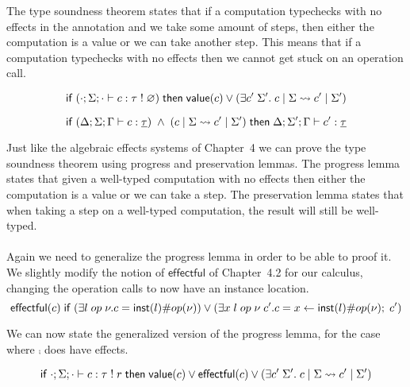 {The type soundness theorem states that if a computation typechecks with no effects in the annotation and we take some amount of steps, then either the computation is a value or we can take another step.
This means that if a computation typechecks with no effects then we cannot get stuck on an operation call.

\begin{lemma}[Progress]
\[
	\mathsf{if}\;
		(\cdot;\Sigma;\cdot \vdash c : \tau \; ! \; \varnothing)
	\;\mathsf{then}\;
		\mathsf{value}(c)
		\lor
		(\exists c' \; \Sigma'.\; c \;|\; \Sigma \rightsquigarrow c' \;|\; \Sigma')
\]
\end{lemma}

\begin{lemma}[Preservation]
\[
	\mathsf{if}\;
		(\Delta;\Sigma;\Gamma \vdash c : \underline{\tau})
		\;\land\;
		(c \;|\; \Sigma \rightsquigarrow c' \;|\; \Sigma')
	\;\mathsf{then}\;
		\Delta;\Sigma';\Gamma \vdash c' : \underline{\tau}
\]
\end{lemma}

Just like the algebraic effects systems of Chapter~4 we can prove the type soundness theorem using progress and preservation lemmas.
The progress lemma states that given a well-typed computation with no effects then either the computation is a value or we can take a step.
The preservation lemma states that when taking a step on a well-typed computation, the result will still be well-typed.
\\\\
Again we need to generalize the progress lemma in order to be able to proof it.
We slightly modify the notion of $\mathsf{effectful}$ of Chapter~4.2 for our calculus, changing the operation calls to now have an instance location.
	\[ \mathsf{effectful}(c) \;\mathsf{if}\; (\exists l \; op \; \nu. c = \mathsf{inst}(l) \# op(\nu)) \lor (\exists x \; l \; op \; \nu \; c'. c = x \leftarrow \mathsf{inst}(l) \# op(\nu) ;\; c') \]

We can now state the generalized version of the progress lemma, for the case where $\comp$ does have effects.

\begin{lemma}
\[
	\mathsf{if}\;
		\cdot;\Sigma;\cdot \vdash c : \tau \; ! \; r
	\;\mathsf{then}\;
		\mathsf{value}(c)
		\lor
		\mathsf{effectful}(c)
		\lor
		(\exists c' \; \Sigma'.\; c \;|\; \Sigma \rightsquigarrow c' \;|\; \Sigma')
\]
\end{lemma}

}
